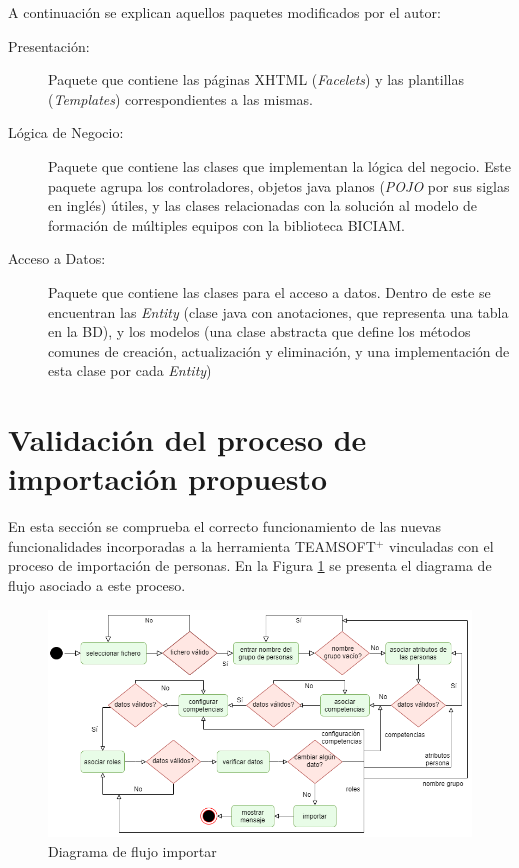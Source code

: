 A continuación se explican aquellos paquetes modificados por el autor:
\begin{description}
	\item[Presentación:] Paquete que contiene las páginas XHTML (\textit{Facelets}) y las plantillas (\textit{Templates}) correspondientes a las mismas.
	\item[Lógica de Negocio:] Paquete que contiene las clases que implementan la lógica del negocio. Este paquete agrupa los controladores, objetos java planos (\textit{POJO} por sus siglas en inglés) útiles, y las clases relacionadas con la solución al modelo de formación de múltiples equipos con la biblioteca BICIAM. 
	\item[Acceso a Datos:] Paquete que contiene las clases para el acceso a datos. Dentro de este se encuentran las \textit{Entity} (clase java con anotaciones, que representa una tabla en la BD), y los modelos (una clase abstracta que define los métodos comunes de creación, actualización y eliminación, y una implementación de esta clase por cada \textit{Entity}) 
\end{description}

\section{Validación del proceso de importación propuesto}
En esta sección se comprueba el correcto funcionamiento de las nuevas funcionalidades incorporadas a la herramienta TEAMSOFT$^+$ vinculadas con el proceso de importación de personas. En la Figura \ref{fig:diagrama-flujo-importar} se presenta el diagrama de flujo asociado a este proceso. 

\begin{figure}[H]
	\centering
	\includegraphics[width=\textwidth]{figuras/diagramas-teamsoft-Flujo-Importar.png}
	\caption{Diagrama de flujo importar} \label{fig:diagrama-flujo-importar}
\end{figure}

